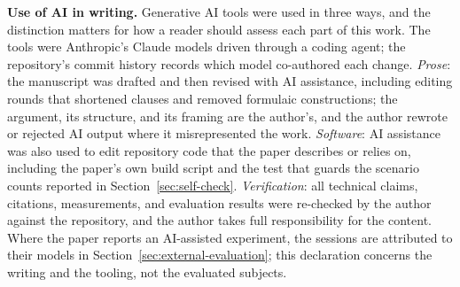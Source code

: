\documentclass{sbc2019}%
\begin{document}
\noindent\textbf{Use of AI in writing.}
Generative AI tools were used in three ways, and the distinction matters
for how a reader should assess each part of this work. The tools were
Anthropic's Claude models driven through a coding agent; the repository's
commit history records which model co-authored each change.
\emph{Prose}: the manuscript was drafted and then revised with AI
assistance, including editing rounds that shortened clauses and removed
formulaic constructions;
the argument, its structure, and its framing are the author's, and the
author rewrote or rejected AI output where it misrepresented the work.
\emph{Software}: AI assistance was also used to edit repository code that
the paper describes or relies on, including the paper's own build script
and the test that guards the scenario counts reported in
Section~\ref{sec:self-check}. \emph{Verification}: all technical claims,
citations, measurements, and evaluation results were re-checked by the
author against the repository, and the author takes full responsibility
for the content. Where the paper reports an AI-assisted experiment, the
sessions are attributed to their models in
Section~\ref{sec:external-evaluation}; this declaration concerns the
writing and the tooling, not the evaluated subjects.



\end{document}
